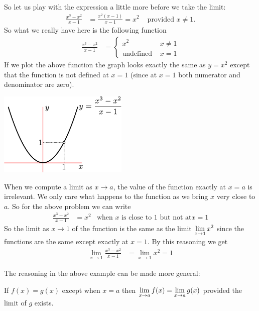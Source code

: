 \begin{eg}
So let us play with the expression a little more before we take the limit:
\begin{align*}
  \frac{x^3-x^2}{x-1} &= \frac{x^2(x-1)}{x-1} = x^2
  & \text{ provided $x \neq 1$.}
\end{align*}
So what we really have here is the following function
\begin{align*}
  \frac{x^3-x^2}{x-1} &= \begin{cases}
                          x^2 & x \neq 1 \\
                          \text{undefined } & x = 1
                         \end{cases}
\end{align*}
If we plot the above function the graph looks exactly the same as $y=x^2$
except that the function is not defined at $x=1$ (since at $x=1$ both numerator and
denominator are zero).
\begin{efig}
\begin{center}
 \includegraphics[height=4cm]{rat1}
\end{center}
\end{efig}
When we compute a limit as $x \to a$, the value of the function exactly at
$x=a$ is irrelevant. We only care what happens to the function as we bring $x$
very close to $a$. So for the above problem we can write
\begin{align*}
    \frac{x^3-x^2}{x-1} &= x^2 & \text{when $x$ is close to $1$ but not at
$x=1$}
\end{align*}
So the limit as $x \to 1$ of the function is the same as the limit $\displaystyle \lim_{x\to
1} x^2$ since the functions are the same except exactly at $x=1$. By this
reasoning we get
\begin{align*}
    \lim_{x \to 1} \frac{x^3-x^2}{x-1} &=
    \lim_{x \to 1} x^2 = 1
\end{align*}
\end{eg}
The reasoning in the above example can be made more general:
\begin{theorem}
 If $f(x) = g(x)$ except when $x=a$ then $\displaystyle \lim_{x\to a} f(x) = \lim_{x\to
a}
g(x)$ provided the limit of $g$ exists.
\end{theorem}

